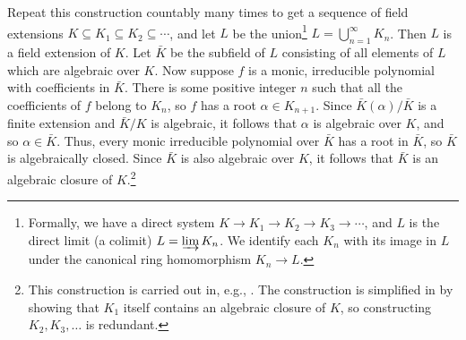 \begin{solution}
Repeat this construction countably many times to get a sequence of field extensions \(K \subseteq K_1 \subseteq K_2 \subseteq \cdots\), and let \(L\) be the union\footnote{%
Formally, we have a direct system \(K \to K_1 \to K_2 \to K_3 \to \cdots\), and \(L\) is the direct limit (a colimit) \(L = \varinjlim K_n\).
We identify each \(K_n\) with its image in \(L\) under the canonical ring homomorphism \(K_n \to L\).
}
\(L = \bigcup_{n=1}^\infty K_n\).
Then \(L\) is a field extension of \(K\).
Let \(\bar{K}\) be the subfield of \(L\) consisting of all elements of \(L\) which are algebraic over \(K\).
Now suppose \(f\) is a monic, irreducible polynomial with coefficients in \(\bar{K}\).
There is some positive integer \(n\) such that all the coefficients of \(f\) belong to \(K_n\), so \(f\) has a root \(\alpha \in K_{n+1}\).
Since \(\bar{K}(\alpha) / \bar{K}\) is a finite extension and \(\bar{K} / K\) is algebraic, it follows that \(\alpha\) is algebraic over \(K\), and so \(\alpha \in \bar{K}\).
Thus, every monic irreducible polynomial over \(\bar{K}\) has a root in \(\bar{K}\), so \(\bar{K}\) is algebraically closed.
Since \(\bar{K}\) is also algebraic over \(K\), it follows that \(\bar{K}\) is an algebraic closure of \(K\).\footnote{%
This construction is carried out in, e.g., \cite[Chapter V, Theorem 2.5 and Corollary 2.6]{LangAlgebra}.
The construction is simplified in \cite{GilmerAlgebraicClosure} by showing that \(K_1\) itself contains an algebraic closure of \(K\), so constructing \(K_2, K_3, \ldots\) is redundant.
}%
\end{solution}